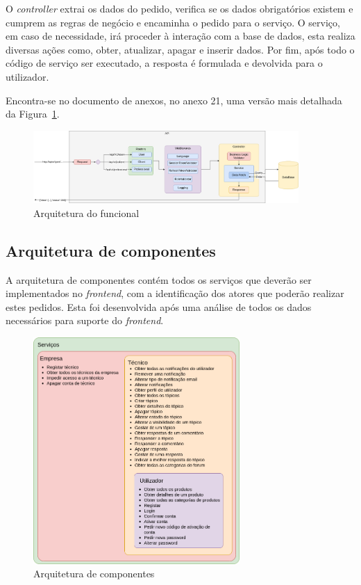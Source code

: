 O \textit{controller} extrai os dados do pedido, verifica se os dados obrigatórios existem e cumprem as regras de negócio e encaminha o pedido para o serviço. O serviço, em caso de necessidade, irá proceder à interação com a base de dados, esta realiza diversas ações como, obter, atualizar, apagar e inserir dados. Por fim, após todo o código de serviço ser executado, a resposta é formulada e devolvida para o utilizador.

Encontra-se no documento de anexos, no anexo 21, uma versão mais detalhada da Figura~\ref*{fig:47}.

\begin{figure}[htb]
  \centering
  \includegraphics[width=0.9\textwidth]{images/Arquiteturas/arquitetura_funcional.png}
  \caption{Arquitetura do funcional}
  \label{fig:47}
\end{figure}

\newpage

\subsection{Arquitetura de componentes}
A arquitetura de componentes contém todos os serviços que deverão ser implementados no \textit{frontend}, com a identificação dos atores que poderão realizar estes pedidos. Esta foi desenvolvida após uma análise de todos os dados necessários para suporte do \textit{frontend}.

\begin{figure}[htb]
  \centering
  \includegraphics[width=0.7\textwidth]{images/Arquiteturas/arquitetura_de_componentes_final.png}
  \caption{Arquitetura de componentes}
  \label{fig:48}
\end{figure}

